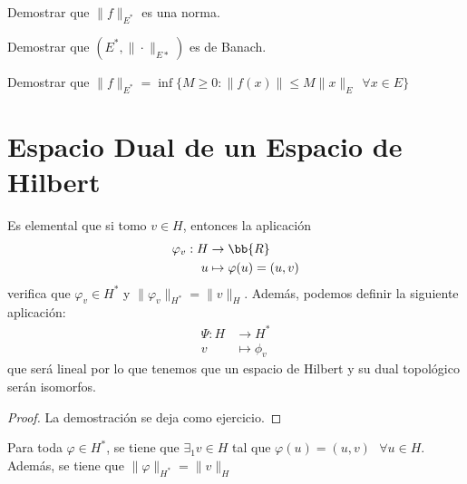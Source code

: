 \begin{ejercicio} %
    Demostrar que $\|f\|_{E^*}$ es una norma.
\end{ejercicio}

\begin{ejercicio}
    Demostrar que $(E^*, \|\cdot\|_{E*})$ es de Banach.
\end{ejercicio}

\begin{ejercicio}
    Demostrar que $\|f\|_{E^*} = \inf\{M\geq 0 : \|f(x)\| \leq M\|x\|_E\ \ \forall x \in E\}$
\end{ejercicio}

\section{Espacio Dual de un Espacio de Hilbert}

\begin{observacion}
    Es elemental que si tomo $v\in H$, entonces la aplicación
    \begin{align*}
        \varphi_v : H &\to \bb{R}\\
        u &\mapsto \varphi(u) = (u,v)
    \end{align*}
    verifica que $\varphi_v\in H^*$ y $\|\varphi_v\|_{H^*} = \|v\|_H$. Además, podemos definir la siguiente aplicación:
    \begin{align*}
        \Psi: H &\to H^*\\
        v &\mapsto \phi_v
    \end{align*}
    que será lineal por lo que tenemos que un espacio de Hilbert y su dual topológico serán isomorfos.

    \begin{proof}
        La demostración se deja como ejercicio.
    \end{proof}
\end{observacion}

\begin{teo}
    Para toda $\varphi\in H^*$, se tiene que $\exists_1 v\in H$ tal que $\varphi(u)=(u,v)\ \ \ \forall u\in H$. Además, se tiene que $\|\varphi\|_{H^*} = \|v\|_H$
\end{teo}




